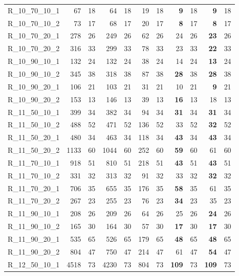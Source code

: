 \documentclass{article}
\begin{document}
\begin{longtable}{lrrrrrrrrrr}
R\_10\_70\_10\_1 & 67 & 18 & 64 & 18 & 19 & 18 & \textbf{9} & 18 & \textbf{9} & 18 \\
R\_10\_70\_10\_2 & 73 & 17 & 68 & 17 & 20 & 17 & \textbf{8} & 17 & \textbf{8} & 17 \\
R\_10\_70\_20\_1 & 278 & 26 & 249 & 26 & 62 & 26 & 24 & 26 & \textbf{23} & 26 \\
R\_10\_70\_20\_2 & 316 & 33 & 299 & 33 & 78 & 33 & 23 & 33 & \textbf{22} & 33 \\
R\_10\_90\_10\_1 & 132 & 24 & 132 & 24 & 38 & 24 & 14 & 24 & \textbf{13} & 24 \\
R\_10\_90\_10\_2 & 345 & 38 & 318 & 38 & 87 & 38 & \textbf{28} & 38 & \textbf{28} & 38 \\
R\_10\_90\_20\_1 & 106 & 21 & 103 & 21 & 31 & 21 & 10 & 21 & \textbf{9} & 21 \\
R\_10\_90\_20\_2 & 153 & 13 & 146 & 13 & 39 & 13 & \textbf{16} & 13 & 18 & 13 \\
R\_11\_50\_10\_1 & 399 & 34 & 382 & 34 & 94 & 34 & \textbf{31} & 34 & \textbf{31} & 34 \\
R\_11\_50\_10\_2 & 488 & 52 & 471 & 52 & 136 & 52 & 33 & 52 & \textbf{32} & 52 \\
R\_11\_50\_20\_1 & 480 & 34 & 463 & 34 & 118 & 34 & \textbf{43} & 34 & \textbf{43} & 34 \\
R\_11\_50\_20\_2 & 1133 & 60 & 1044 & 60 & 252 & 60 & \textbf{59} & 60 & 61 & 60 \\
R\_11\_70\_10\_1 & 918 & 51 & 810 & 51 & 218 & 51 & \textbf{43} & 51 & \textbf{43} & 51 \\
R\_11\_70\_10\_2 & 331 & 32 & 313 & 32 & 91 & 32 & 33 & 32 & \textbf{32} & 32 \\
R\_11\_70\_20\_1 & 706 & 35 & 655 & 35 & 176 & 35 & \textbf{58} & 35 & 61 & 35 \\
R\_11\_70\_20\_2 & 267 & 23 & 255 & 23 & 76 & 23 & \textbf{34} & 23 & 35 & 23 \\
R\_11\_90\_10\_1 & 208 & 26 & 209 & 26 & 64 & 26 & 25 & 26 & \textbf{24} & 26 \\
R\_11\_90\_10\_2 & 165 & 30 & 164 & 30 & 57 & 30 & \textbf{17} & 30 & \textbf{17} & 30 \\
R\_11\_90\_20\_1 & 535 & 65 & 526 & 65 & 179 & 65 & \textbf{48} & 65 & \textbf{48} & 65 \\
R\_11\_90\_20\_2 & 804 & 47 & 750 & 47 & 214 & 47 & 61 & 47 & \textbf{54} & 47 \\
R\_12\_50\_10\_1 & 4518 & 73 & 4230 & 73 & 804 & 73 & \textbf{109} & 73 & \textbf{109} & 73 \\

\end{longtable}
\end{document}
